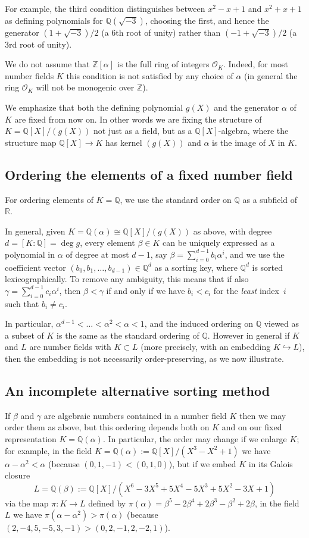 \documentclass{article}
\def\Z{{\mathbb Z}}
\def\Q{{\mathbb Q}}
\def\R{{\mathbb R}}
\def\OO{{\mathcal O}}
\begin{document}
For example, the third condition distinguishes between $x^2-x+1$ and
$x^2+x+1$ as defining polynomials for $\Q(\sqrt{-3})$, choosing the
first, and hence the generator $(1+\sqrt{-3})/2$ (a 6th root of unity)
rather than $(-1+\sqrt{-3})/2$ (a 3rd root of unity).


We do not assume that $\Z[\alpha]$ is the full ring of integers
$\OO_K$.  Indeed, for most number fields $K$ this condition is
not satisfied by any choice of $\alpha$ (in general the ring $\OO_K$
will not be monogenic over $\Z$).

We emphasize that both the defining polynomial $g(X)$ and the
generator $\alpha$ of~$K$ are fixed from now on.  In other words we
are fixing the structure of $K=\Q[X]/(g(X))$ not just as a field, but
as a $\Q[X]$-algebra, where the structure map $\Q[X]\to K$ has kernel
$(g(X))$ and $\alpha$ is the image of $X$ in $K$.

\subsection{Ordering the elements of a fixed number field}\label{sec:ordfix}
For ordering elements of $K=\Q$, we use the standard order on $\Q$ as
a subfield of~$\R$.

In general, given $K=\Q(\alpha)\cong \Q[X]/(g(X))$ as above, with
degree $d=[K:\Q]=\deg g$, every element $\beta\in K$ can be uniquely
expressed as a polynomial in $\alpha$ of degree at most $d-1$, say
$\beta=\sum_{i=0}^{d-1}b_i\alpha^i$, and we use the coefficient vector
$(b_0,b_1,\dots,b_{d-1})\in\Q^d$ as a sorting key, where $\Q^d$ is
sorted lexicographically.  To remove any ambiguity, this means that if
also $\gamma=\sum_{i=0}^{d-1}c_i\alpha^i$, then $\beta<\gamma$ if and
only if we have $b_i<c_i$ for the \textit{least} index~$i$ such that
$b_i\not=c_i$.

In particular, $\alpha^{d-1}<\dots<\alpha^2<\alpha<1$, and the induced
ordering on $\Q$ viewed as a subset of $K$ is the same as the standard
ordering of $\Q$.  However in general if $K$ and $L$ are number fields
with $K\subset L$ (more precisely, with an embedding $K\hookrightarrow
L$), then the embedding is not necessarily order-preserving, as we now
illustrate.

\subsection{An incomplete alternative sorting method}

If $\beta$ and $\gamma$ are algebraic numbers contained in a number
field $K$ then we may order them as above, but this ordering depends
both on $K$ and on our fixed representation $K=\Q(\alpha)$.  In
particular, the order may change if we enlarge $K$; for example, in
the field $K=\Q(\alpha):=\Q[X]/(X^3-X^2+1)$ we have $\alpha-\alpha^2 <
\alpha$ (because $(0,1,-1) < (0,1,0)$), but if we embed $K$ in its
Galois closure $$L=\Q(\beta):=\Q[X]/(X^6 - 3X^5 + 5X^4 - 5X^3 + 5X^2 -
3X + 1)$$ via the map $\pi:K\to L$ defined by $\pi(\alpha) = \beta^5 -
2\beta^4 + 2\beta^3 - \beta^2 + 2\beta$, in the field $L$ we have
$\pi(\alpha-\alpha^2) > \pi(\alpha)$ (because
$(2,-4,5,-5,3,-1)>(0,2,-1,2,-2,1)$).
\end{document}
